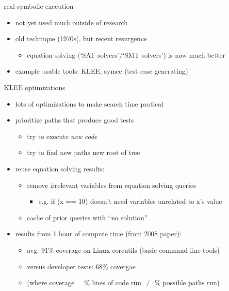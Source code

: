 

\begin{frame}{real symbolic execution}
    \begin{itemize}
    \item not yet used much outside of research
    \item old technique (1970s), but recent resurgence 
        \begin{itemize}
        \item equation solving (`SAT solvers'/`SMT solvers') is now much better
        \end{itemize}
    \vspace{.5cm}
\item example usable tools: KLEE, symcc (test case generating)
    \end{itemize}
\end{frame}

\begin{frame}{KLEE optimizations}
\begin{itemize}
\item lots of optimizations to make search time pratical
\vspace{.5cm}
\item prioritize paths that produce good tests
    \begin{itemize}
    \item try to execute \textit{new code}
    \item try to find new paths new root of tree
    \end{itemize}
\item reuse equation solving results:
    \begin{itemize}
    \item remove irrelevant variables from equation solving queries
        \begin{itemize}
        \item e.g. if (x == 10) doesn't need variables unrelated to x's value
        \end{itemize}
    \item cache of prior queries with ``no solution''
    \end{itemize}
\vspace{.5cm}
\item results from 1 hour of compute time (from 2008 paper):
    \begin{itemize}
    \item avg. 91\% coverage on Linux coreutils (basic command line tools)
    \item versus developer tests: 68\% covergae
    \item (where coverage = \% lines of code run $\not=$ \% possible paths run)
    \end{itemize}
\end{itemize}
\end{frame}
